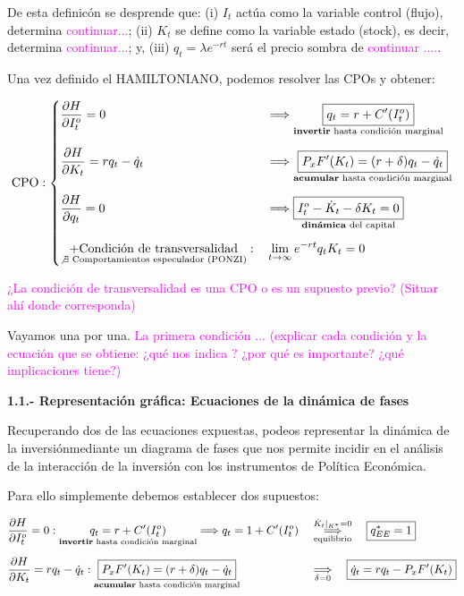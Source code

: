 \documentclass[10pt,a4paper]{article}
\begin{document}
De esta definicón se desprende que: (i) $I_t$ actúa como la variable control (flujo), determina \textcolor{magenta}{continuar...}; (ii) $K_t$ se define como la variable estado (stock), es decir, determina \textcolor{magenta}{continuar...}; y, (iii) $q_t=\lambda e^{-rt}$ será el precio sombra de \textcolor{magenta}{continuar ....}. 

Una vez definido el HAMILTONIANO, podemos resolver las CPOs y obtener:

$$\begin{aligned}
  \text{CPO}:
    \left\{\begin{aligned}
        &\frac{\partial H}{\partial I_t^o}=0&&\Longrightarrow \underset{\text{\scriptsize \textbf{invertir} hasta condición marginal}}{\boxed{q_t=r+C'(I_t^o)}}\\[0.5em]
        &\frac{\partial H}{\partial K_t}=rq_t-\dot q_t&&\Longrightarrow \underset{\text{\scriptsize \textbf{acumular} hasta condición marginal}}{\boxed{P_xF'(K_t)=(r+\delta)q_t-\dot q_t}}\\[0.5em]
        &\frac{\partial H}{\partial q_t}=0&&\Longrightarrow \underset{\text{\scriptsize \textbf{dinámica} del capital}}{\boxed{I_t^o-\dot K_t-\delta K_t=0}}\\[0.5em]
        &\underset{\text{\scriptsize$\not\exists$ Comportamientos especulador (PONZI)}}{+\text{Condición de transversalidad}}:&&\lim_{t\to\infty}e^{-rt}q_tK_t=0
    \end{aligned}\right.
\end{aligned}$$

\textcolor{magenta}{¿La condición de transversalidad es una CPO o es un supuesto previo? (Situar ahí donde corresponda)}

Vayamos una por una. \textcolor{magenta}{La primera condición ... (explicar cada condición y la ecuación que se obtiene: ¿qué nos indica ? ¿por qué es importante? ¿qué implicaciones tiene?)}


\textbf{1.1.- Representación gráfica: Ecuaciones de la dinámica de fases}

Recuperando dos de las ecuaciones expuestas, podeos representar la dinámica de la inversiónmediante un diagrama de fases que nos permite incidir en el análisis de la interacción de la inversión con los instrumentos de Política Económica.

Para ello simplemente debemos establecer dos supuestos:


$$\begin{aligned}
  &\frac{\partial H}{\partial I_t^o}=0: \underset{\text{\scriptsize \textbf{invertir} hasta condición marginal}}{{q_t=r+C'(I_t^o)}}\Longrightarrow q_t=1+C'(I_t^o)&&\overset{\dot K_t|_{K^*}=0}{\underset{\text{\scriptsize equilibrio}}{\Longrightarrow}}\quad \boxed{q_{EE}^*=1}\\[0.5em]
  &\frac{\partial H}{\partial K_t}=rq_t-\dot q_t: \underset{\text{\scriptsize \textbf{acumular} hasta condición marginal}}{\boxed{P_xF'(K_t)=(r+\delta)q_t-\dot q_t}}&&\underset{\delta=0}{\Longrightarrow}\quad\boxed{\dot q_t=rq_t-P_xF'(K_t)}
\end{aligned}$$
\end{document}
